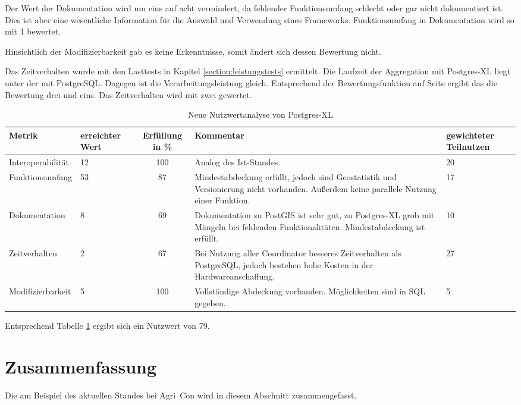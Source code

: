 Der Wert der Dokumentation wird um eins auf acht vermindert, da fehlender Funktionsumfang schlecht oder gar nicht dokumentiert ist.
Dies ist aber eine wesentliche Information für die Auswahl und Verwendung eines Frameworks.
Funktionsumfang in Dokumentation wird so mit 1 bewertet.

Hinsichtlich der Modifizierbarkeit gab es keine Erkenntnisse, somit ändert sich dessen Bewertung nicht.

Das Zeitverhalten wurde mit den Lasttests in Kapitel \ref{section:leistungstests} ermittelt.
Die Laufzeit der Aggregation mit Postgres-XL liegt unter der mit PostgreSQL.
Dagegen ist die Verarbeitungsleistung gleich.
Entsprechend der Bewertungsfunktion auf Seite \pageref{bf:zeitverhalten} ergibt das die Bewertung drei und eins.
Das Zeitverhalten wird mit zwei gewertet.

\begin{table}[h!]
\centering
\small
\begin{tabular}{l|p{1.8cm}|c|p{3.1cm}|p{1.8cm}}
\textbf{Metrik} & \textbf{erreichter Wert} & \textbf{Erfüllung in \%} & \textbf{Kommentar} & \textbf{gewichteter Teilnutzen} \\ \hline
Interoperabilität & 12 & 100 & Analog des Ist-Standes. & 20 \\ \hline
Funktionsumfang & 53 & 87 & Mindestabdeckung erfüllt, jedoch sind Geostatistik und Versionierung nicht vorhanden. Außerdem keine parallele Nutzung einer Funktion. & 17 \\ \hline
Dokumentation & 8 & 69 & Dokumentation zu PostGIS ist sehr gut, zu Postgres-XL grob mit Mängeln bei fehlenden Funktionalitäten. Mindestabdeckung ist erfüllt. & 10 \\ \hline
Zeitverhalten & 2 & 67 & Bei Nutzung aller Coordinator besseres Zeitverhalten als PostgreSQL, jedoch bestehen hohe Kosten in der Hardwareanschaffung. & 27 \\ \hline
Modifizierbarkeit & 5 & 100 & Vollständige Abdeckung vorhanden. Möglichkeiten sind in SQL gegeben. & 5 \\
\end{tabular}
\caption{Neue Nutzwertanalyse von Postgres-XL}
\label{table:nutzwertanalyse2-postgresxl}
\end{table}
Entsprechend Tabelle \ref{table:nutzwertanalyse2-postgresxl} ergibt sich ein Nutzwert von 79.

\section{Zusammenfassung}
Die \titel{} am Beispiel des aktuellen Standes bei Agri~Con wird in diesem Abschnitt zusammengefasst.

